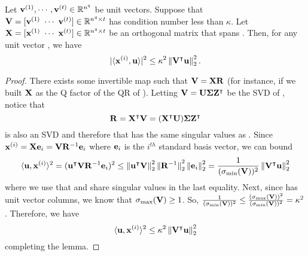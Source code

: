 \begin{lemma}
\label{lem:conditioning-to-ortho-inner-prod}
Let \(\boldsymbol{\mathrm{v}}^{(1)},\cdots,\boldsymbol{\mathrm{v}}^{(t)} \in {\mathbb R}^{n^q}\) be unit vectors.
Suppose that \(\mathbf{V} = [\boldsymbol{\mathrm{v}}^{(1)} ~ \cdots ~ \boldsymbol{\mathrm{v}}^{(t)}] \in {\mathbb R}^{n^q \times t}\) has condition number less than \(\kappa\).
Let \(\mathbf{X} = [\boldsymbol{\mathrm{x}}^{(1)} ~ \cdots ~ \boldsymbol{\mathrm{x}}^{(t)}] \in {\mathbb R}^{n^q \times t}\) be an orthogonal matrix that spans \mV.
Then, for any unit vector \vu, we have
\[
	|\langle \vx^{(i)}, \vu\rangle|^2
	\leq \kappa^2 \norm{\mV^\intercal\vu}_2^2.
\]
\end{lemma}
\begin{proof}
There exists some invertible map \mR such that \(\mathbf{V} = \mathbf{X}\mathbf{R}\) (for instance, if we built \(\mathbf{X}\) as the Q factor of the QR of \mV).
Letting \(\mathbf{V}=\mathbf{U}\mathbf{\Sigma}\mathbf{Z}^\intercal\) be the SVD of \mV, notice that
\[
	\mathbf{R} = \mathbf{X}^\intercal\mathbf{V} = (\mathbf{X}^\intercal\mathbf{U})\mathbf{\Sigma}\mathbf{Z}^\intercal
\]
is also an SVD and therefore that \mR has the same singular values as \mV.
Since \(\boldsymbol{\mathrm{x}}^{(i)} = \mathbf{X}\boldsymbol{\mathrm{e}}_i = \mathbf{V}\mathbf{R}^{-1}\boldsymbol{\mathrm{e}}_i\) where \(\boldsymbol{\mathrm{e}}_i\) is the \(i^{th}\) standard basis vector, we can bound
\[
	\langle \vu, \vx^{(i)}\rangle^2
    = (\vu^\intercal\mV\mR^{-1}\ve_i)^2
    \leq \norm{\vu^\intercal\mV}_2^2 \norm{\mR^{-1}}_2^2 \norm{\ve_i}_2^2
    = \frac{1}{(\sigma_{\min}(\mV))^2} \norm{\mV^\intercal\vu}_2^2
\]
where we use that \mR and \mV share singular values in the last equality.
Next, since \mV has unit vector columns, we know that \(\sigma_{\max}(\mathbf{V}) \geq 1\).
So, \(\frac{1}{(\sigma_{\min}(\mathbf{V}))^2} \leq \frac{(\sigma_{\max}(\mathbf{V}))^2}{(\sigma_{\min}(\mathbf{V}))^2} = \kappa^2\).
Therefore, we have
\[
	\langle \vu, \vx^{(i)}\rangle^2
	\leq \kappa^2 \norm{\mV^\intercal\vu}_2^2
\]
completing the lemma.
\end{proof}
